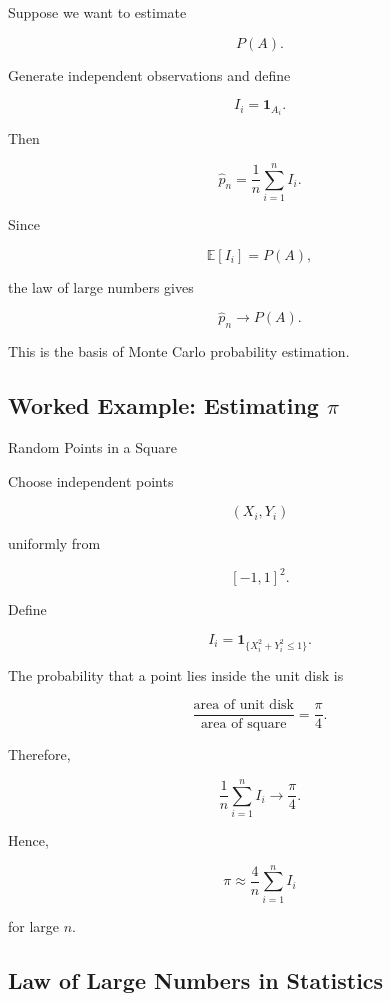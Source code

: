 Suppose we want to estimate

\[
P(A).
\]

Generate independent observations and define

\[
I_i
=
\mathbf{1}_{A_i}.
\]

Then

\[
\widehat{p}_n
=
\frac1n
\sum_{i=1}^{n}I_i.
\]

Since

\[
\mathbb{E}[I_i]=P(A),
\]

the law of large numbers gives

\[
\boxed{
\widehat{p}_n
\to
P(A).
}
\]

This is the basis of Monte Carlo probability estimation.

\subsection{Worked Example: Estimating \(\pi\)}
\label{subsec:worked-monte-carlo-pi}

\begin{workedexamplebox}{Random Points in a Square}

Choose independent points

\[
(X_i,Y_i)
\]

uniformly from

\[
[-1,1]^2.
\]

Define

\[
I_i
=
\mathbf{1}_{\{X_i^2+Y_i^2\leq1\}}.
\]

The probability that a point lies inside the unit disk is

\[
\frac{
\text{area of unit disk}
}{
\text{area of square}
}
=
\frac{\pi}{4}.
\]

Therefore,

\[
\frac1n
\sum_{i=1}^{n}I_i
\to
\frac{\pi}{4}.
\]

Hence,

\begin{answerbox}
\[
\boxed{
\pi
\approx
\frac4n
\sum_{i=1}^{n}I_i
}
\]

for large \(n\).
\end{answerbox}

\end{workedexamplebox}

\subsection{Law of Large Numbers in Statistics}
\label{subsec:lln-statistics}

